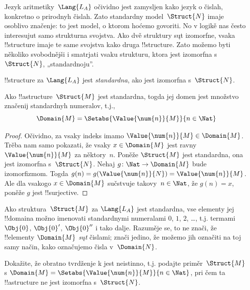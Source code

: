 \documentclass[../../../include/open-logic-section]{subfiles}
\begin{document}

Jezyk aritmetiky~$\Lang{L_A}$ očividno jest zamysljen kako jezyk o
čislah, konkretno o prirodnyh čislah. Zato standardny
model~$\Struct{N}$ imaje osoblivo značenje: to jest model, o ktorom
hoćemo govoriti. No v logikě nas često interesujut samo strukturna
svojstva. Ako dvě struktury sųt izomorfne, vsaka !!{structure} imaje
te same svojstva kako druga !!{structure}. Zato možemo byti několiko
svobodnějši i smatrjati vsaku strukturu, ktora jest izomorfna
s~$\Struct{N}$, „standardnoju”.

\begin{defn}
!!{structure} za $\Lang{L_A}$ jest \emph{standardna}, ako jest
izomorfna s~$\Struct{N}$.
\end{defn}

\begin{prop}
 Ako !!a{structure}~$\Struct{M}$ jest standardna,
togda jej domen jest množstvo značenij standardnyh numeralov, t.j.,
\[
\Domain{M} = \Setabs{\Value{\num{n}}{M}}{n \in \Nat}
\]
\end{prop}

\begin{proof}
Očividno, za vsaky indeks imamo $\Value{\num{n}}{M} \in \Domain{M}$.
Trěba nam samo
pokazati, že vsaky $x \in \Domain{M}$ jest ravny
$\Value{\num{n}}{M}$ za něktory~$n$. Poněže $\Struct{M}$ jest
standardna, ona jest izomorfna s~$\Struct{N}$. Nehaj $g\colon \Nat
\to \Domain{M}$ bude izomorfizmom. Togda $g(n) =
g(\Value{\num{n}}{N}) = \Value{\num{n}}{M}$. Ale dla vsakogo $x \in
\Domain{M}$ sučstvuje takovy~$n \in \Nat$, že $g(n) = x$, poněže $g$ jest
!!{surjective}.
\end{proof}

\begin{explain}
Ako struktura~$\Struct{M}$ za $\Lang{L_A}$ jest standardna, vse
elementy jej !!{domain}a možno imenovati standardnymi numeralami
$\num{0}$, $\num{1}$, $\num{2}$, \dots, t.j. termami $\Obj{0}$,
$\Obj{0}'$, $\Obj{0}''$ i tako dalje. Razuměje se, to ne znači, že
!!{element}y $\Domain{M}$ \emph{sųt} čislami; znači jedino, že možemo
jih označiti na toj samy način, kako označujemo čisla
v~$\Domain{N}$.
\end{explain}

\begin{prob}
Dokažite, že obratno tvrdženje k
 jest neistinno, t.j.
podajte priměr~$\Struct{M}$ s $\Domain{M} =
\Setabs{\Value{\num{n}}{M}}{n \in \Nat}$, pri čem ta !!a{structure}
ne jest izomorfna s~$\Struct{N}$.
\end{prob}
\end{document}
